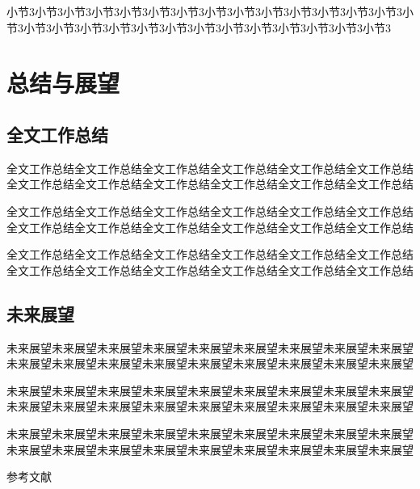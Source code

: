 \documentclass[a4paper, 12pt, oneside]{article}
\theoremstyle{cn_theorem}
\begin{document}
小节3小节3小节3小节3小节3小节3小节3小节3小节3小节3小节3小节3小节3小节3小节3小节3小节3小节3小节3小节3小节3小节3小节3小节3小节3小节3小节3小节3


\section{总结与展望}

\subsection{全文工作总结}
全文工作总结全文工作总结全文工作总结全文工作总结全文工作总结全文工作总结全文工作总结全文工作总结全文工作总结全文工作总结全文工作总结全文工作总结

全文工作总结全文工作总结全文工作总结全文工作总结全文工作总结全文工作总结全文工作总结全文工作总结全文工作总结全文工作总结全文工作总结全文工作总结

全文工作总结全文工作总结全文工作总结全文工作总结全文工作总结全文工作总结全文工作总结全文工作总结全文工作总结全文工作总结全文工作总结全文工作总结


\subsection{未来展望}
未来展望未来展望未来展望未来展望未来展望未来展望未来展望未来展望未来展望未来展望未来展望未来展望未来展望未来展望未来展望未来展望未来展望未来展望

未来展望未来展望未来展望未来展望未来展望未来展望未来展望未来展望未来展望未来展望未来展望未来展望未来展望未来展望未来展望未来展望未来展望未来展望

未来展望未来展望未来展望未来展望未来展望未来展望未来展望未来展望未来展望未来展望未来展望未来展望未来展望未来展望未来展望未来展望未来展望未来展望

\clearpage
{}
{}
\centerline{\heiti 参\hspace{1em}考\hspace{1em}文\hspace{1em}献}
\vspace{1em}

\makeatletter
\renewcommand{\@biblabel}[1]{} %
\renewenvironment{thebibliography}[1]
     {\list{}{\usecounter{enumiv}
              \setlength{\labelwidth}{0pt}
              \setlength{\leftmargin}{2em}    %
              \setlength{\itemindent}{-2em}   %
              \setlength{\labelsep}{0pt}      
              \setlength{\itemsep}{0ex}       %
              \setlength{\parsep}{0pt}}
      \sloppy
      \clubpenalty4000
      \widowpenalty4000}
     {\endlist}
\makeatother
\end{document}
